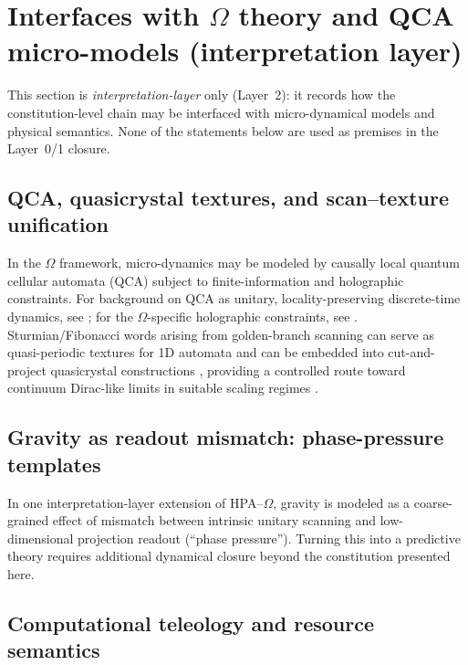 \section{Interfaces with \texorpdfstring{$\Omega$}{Omega} theory and QCA micro-models (interpretation layer)}
\label{sec:interfaces_interpretation}

This section is \emph{interpretation-layer} only (Layer~2): it records how the constitution-level chain may be interfaced with micro-dynamical models and physical semantics. None of the statements below are used as premises in the Layer~0/1 closure.

\subsection{QCA, quasicrystal textures, and scan--texture unification}
\label{sec:qca_quasicrystal}

In the $\Omega$ framework, micro-dynamics may be modeled by causally local quantum cellular automata (QCA) subject to finite-information and holographic constraints. For background on QCA as unitary, locality-preserving discrete-time dynamics, see \cite{Arrighi2019QCAOverview,GrossNesmeVogtsWerner2012}; for the $\Omega$-specific holographic constraints, see \cite{Ma2025FoP}. Sturmian/Fibonacci words arising from golden-branch scanning can serve as quasi-periodic textures for 1D automata and can be embedded into cut-and-project quasicrystal constructions \cite{BaakeGrimm2013AperiodicOrder}, providing a controlled route toward continuum Dirac-like limits in suitable scaling regimes \cite{ArrighiFacchiniForets2014,Ma2025HPA}.

\subsection{Gravity as readout mismatch: phase-pressure templates}
\label{sec:phase_pressure}

In one interpretation-layer extension of HPA--$\Omega$, gravity is modeled as a coarse-grained effect of mismatch between intrinsic unitary scanning and low-dimensional projection readout (``phase pressure''). Turning this into a predictive theory requires additional dynamical closure beyond the constitution presented here.

\subsection{Computational teleology and resource semantics}
\label{sec:teleology}

